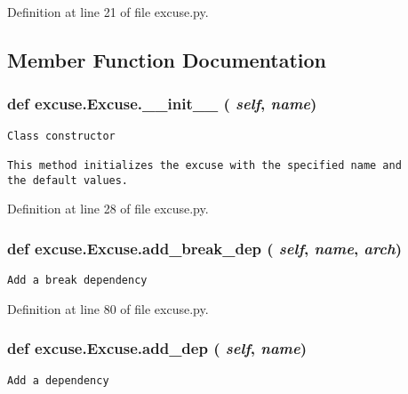 Definition at line 21 of file excuse.py.

\subsection{Member Function Documentation}
\subsubsection{\setlength{\rightskip}{0pt plus 5cm}def excuse.Excuse.\_\-\_\-init\_\-\_\- ( {\em self},  {\em name})}\label{classexcuse_1_1Excuse_4bdb0917f763d74951c621e466e98bdb}




\footnotesize\begin{verbatim}Class constructor

This method initializes the excuse with the specified name and
the default values.
\end{verbatim}
\normalsize
 

Definition at line 28 of file excuse.py.
\subsubsection{\setlength{\rightskip}{0pt plus 5cm}def excuse.Excuse.add\_\-break\_\-dep ( {\em self},  {\em name},  {\em arch})}\label{classexcuse_1_1Excuse_60e00fe0515f2dab003bd29baceedd34}




\footnotesize\begin{verbatim}Add a break dependency\end{verbatim}
\normalsize
 

Definition at line 80 of file excuse.py.
\subsubsection{\setlength{\rightskip}{0pt plus 5cm}def excuse.Excuse.add\_\-dep ( {\em self},  {\em name})}\label{classexcuse_1_1Excuse_fa97c9f61fef17d6028491362153a766}




\footnotesize\begin{verbatim}Add a dependency\end{verbatim}
\normalsize
 

